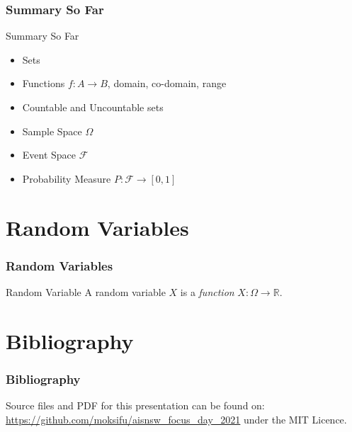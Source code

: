 \documentclass{beamer}
\begin{document}
\begin{frame}
  \frametitle{Summary So Far}
  \begin{block}{Summary So Far}
    \begin{itemize}
      \item Sets
      \item Functions $f: A \rightarrow B$, domain, co-domain, range
      \item Countable and Uncountable sets
      \item Sample Space $\Omega$
      \item Event Space $\mathscr{F}$
      \item Probability Measure $P: \mathscr{F} \rightarrow [0,1]$
    \end{itemize}
  \end{block}
\end{frame}


\section{Random Variables}


\begin{frame}
  \frametitle{Random Variables}
  \begin{alertblock}{Random Variable \parencite[p.~143]{daners}}
    A random variable $X$ is a \emph{function} $X: \Omega \rightarrow \mathbb{R}$.
  \end{alertblock}
\end{frame}


\section{Bibliography}


\begin{frame}
  \frametitle{Bibliography}
  \printbibliography

  Source files and PDF for this presentation can be found on:
  \url{https://github.com/moksifu/aisnsw_focus_day_2021}
  under the MIT Licence.
\end{frame}


\end{document}
